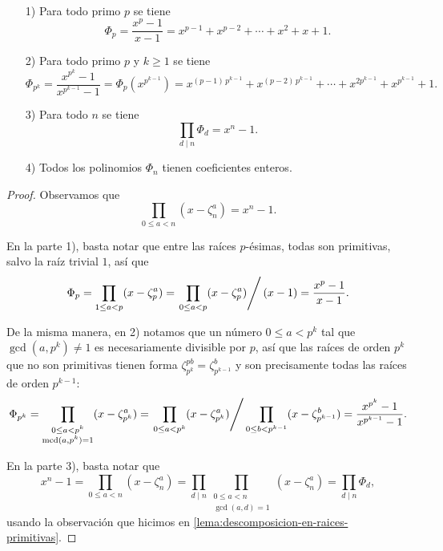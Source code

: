 \begin{proposicion}
~

  \begin{enumerate}
  \item[1)] Para todo primo $p$ se tiene
    $$\Phi_p = \frac{x^p-1}{x-1} = x^{p-1} + x^{p-2} + \cdots + x^2 + x + 1.$$

  \item[2)] Para todo primo $p$ y $k \ge 1$ se tiene
    \[ \Phi_{p^k} = \frac{x^{p^k} - 1}{x^{p^{k-1}} - 1} =
       \Phi_p (x^{p^{k-1}}) =
       x^{(p-1)\,p^{k-1}} + x^{(p-2)\,p^{k-1}} + \cdots + x^{2p^{k-1}} + x^{p^{k-1}} + 1. \]

  \item[3)] Para todo $n$ se tiene
    $$\prod_{d\mid n} \Phi_d = x^n - 1.$$

  \item[4)] Todos los polinomios $\Phi_n$ tienen coeficientes enteros.
  \end{enumerate}

  \begin{proof}
    Observamos que
    $$\prod_{0 \le a < n} (x - \zeta_n^a) = x^n - 1.$$

    En la parte 1), basta notar que entre las raíces $p$-ésimas, todas son
    primitivas, salvo la raíz trivial $1$, así que
    \[ \Phi_p = \prod_{1 \le a < p} (x - \zeta_p^a) =
       \left.\prod_{0 \le a < p} (x - \zeta_p^a)\right/(x-1) =
       \frac{x^p-1}{x-1}. \]

    De la misma manera, en 2) notamos que un número $0 \le a < p^k$ tal que
    $\gcd (a, p^k) \ne 1$ es necesariamente divisible por $p$, así que las
    raíces de orden $p^k$ que no son primitivas tienen forma
    $\zeta_{p^k}^{pb} = \zeta_{p^{k-1}}^b$ y son precisamente todas las
    raíces de orden $p^{k-1}$:
    \[ \Phi_{p^k} =
       \prod_{\substack{0 \le a < p^k \\ \gcd (a,p^k) = 1}} (x - \zeta_{p^k}^a) =
       \left.\prod_{0 \le a < p^k} (x - \zeta_{p^k}^a)\right/\prod_{0 \le b < p^{k-1}} (x - \zeta_{p^{k-1}}^b) =
       \frac{x^{p^k} - 1}{x^{p^{k-1}}-1}. \]

    En la parte 3), basta notar que
    \[ x^n - 1 = \prod_{0\le a < n} (x - \zeta_n^a) = \prod_{d\mid n}
       \prod_{\substack{0 \le a < n \\ \gcd (a,d) = 1}} (x - \zeta_n^a) =
       \prod_{d\mid n} \Phi_d, \]
    usando la observación que hicimos en
    \ref{lema:descomposicion-en-raices-primitivas}.


\end{proof}
\end{proposicion}
